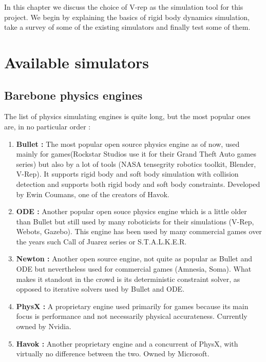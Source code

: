 In this chapter we discuss the choice of V-rep as the simulation tool for this project. We begin by explaining the basics of rigid body dynamics simulation, take a survey of some of the existing simulators and finally test some of them.

\section{Available simulators}
\subsection{Barebone physics engines}
The list of physics simulating engines is quite long, but the most popular ones are, in no particular order :
\begin{enumerate}
\item \textbf{Bullet :} The most popular open source physics engine as of now, used mainly for games(Rockstar Studios use it for their Grand Theft Auto games series) but also by a lot of tools (NASA tensegrity robotics toolkit, Blender, V-Rep). It supports rigid body and soft body simulation with collision detection and supports both rigid body and soft body constraints. Developed by Ewin Coumans, one of the creators of Havok.
\item \textbf{ODE :} Another popular open souce physics engine which is a little older than Bullet but still used by many roboticists for their simulations (V-Rep, Webots, Gazebo). This engine has been used by many commercial games over the years such Call of Juarez series or S.T.A.L.K.E.R.
\item \textbf{Newton :} Another open source engine, not quite as popular as Bullet and ODE but nevertheless used for commercial games (Amnesia, Soma). What makes it standout in the crowd is its deterministic constraint solver, as opposed to iterative solvers used by Bullet and ODE.
\item \textbf{PhysX :} A proprietary engine used primarily for games because its main focus is performance and not necessarily physical accurateness. Currently owned by Nvidia.
\item \textbf{Havok :} Another proprietary engine and a concurrent of PhysX, with virtually no difference between the two. Owned by Microsoft.
\end{enumerate}

